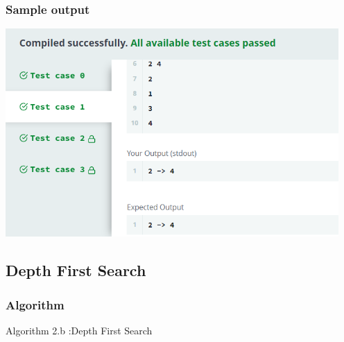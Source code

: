 \documentclass[14pt, letterpaper]{article}
\begin{document}
\subsubsection{Sample output}
\includegraphics[width=5in]{images/admatrix.png}\\ 
\newpage
\subsection{Depth First Search}
\subsubsection{Algorithm}
\hline 
\vspace{0.1cm}
\hspace{0.5cm}Algorithm 2.b :Depth First Search
\vspace{0.1cm}
\hline
\end{document}
